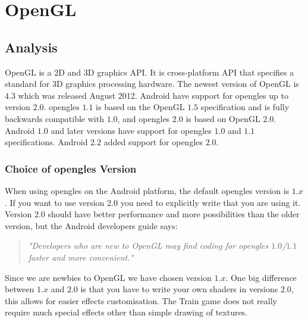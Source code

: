 \chapter{OpenGL}

\section{Analysis}
OpenGL is a 2D and 3D graphics API. It is cross-platform API that specifies a standard for 3D graphics processing hardware. The newest version of OpenGL is $4.3$ which was released August 2012. Android have support for \ac{opengles} up to version $2.0$. \ac{opengles} $1.1$ is based on the OpenGL $1.5$ specification and is fully backwards compatible with $1.0$, and \ac{opengles} $2.0$ is based on OpenGL $2.0$. Android $1.0$ and later versions have support for \ac{opengles} $1.0$ and $1.1$ specifications. Android $2.2$ added support for \ac{opengles} $2.0$. \citep{androidopengl, khronosopengl, khronosopengles}

\subsection*{Choice of \ac{opengles} Version}
When using \ac{opengles} on the Android platform, the default \ac{opengles} version is $1.x$. If you want to use version $2.0$ you need to explicitly write that you are using it. Version $2.0$ should have better performance and more possibilities than the older version, but the Android developers guide says:
\begin{quote}
\textit{"Developers who are new to OpenGL may find coding for \ac{opengles} $1.0$/$1.1$ faster and more convenient."} \citep{androidopengl}
\end{quote}
Since we are newbies to OpenGL we have chosen version $1.x$. One big difference between $1.x$ and $2.0$ is that you have to write your own shaders in versions $2.0$, this allows for easier effects customisation. The Train game does not really require much special effects other than simple drawing of textures.

